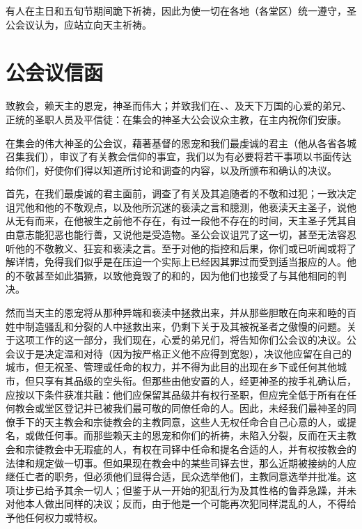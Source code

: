 有人在主日和五旬节期间跪下祈祷，因此为使一切在各地（各堂区）统一遵守，圣公会议认为，应站立向天主祈祷。\par


\section{公会议信函}

致教会，赖天主的恩宠，神圣而伟大；并致我们在、、及天下万国的心爱的弟兄、正统的圣职人员及平信徒：在集会的神圣大公会议众主教，在主内祝你们安康。\par

在集会的伟大神圣的公会议，藉著基督的恩宠和我们最虔诚的君主（他从各省各城召集我们），审议了有关教会信仰的事宜，我们以为有必要将若干事项以书面传达给你们，好使你们得以知道所讨论和调查的内容，以及所颁布和确认的决议。\par

首先，在我们最虔诚的君主面前，调查了有关及其追随者的不敬和过犯；一致决定诅咒他和他的不敬观点，以及他所沉迷的亵渎之言和臆测，他亵渎天主圣子，说他从无有而来，在他被生之前他不存在，有过一段他不存在的时间，天主圣子凭其自由意志能犯恶也能行善，又说他是受造物。圣公会议诅咒了这一切，甚至无法容忍听他的不敬教义、狂妄和亵渎之言。至于对他的指控和后果，你们或已听闻或将了解详情，免得我们似乎是在压迫一个实际上已经因其罪过而受到适当报应的人。他的不敬甚至如此猖獗，以致他竟毁了的和的，因为他们也接受了与其他相同的判决。\par

然而当天主的恩宠将从那种异端和亵渎中拯救出来，并从那些胆敢在向来和睦的百姓中制造骚乱和分裂的人中拯救出来，仍剩下关于及其被祝圣者之傲慢的问题。关于这项工作的这一部分，我们现在，心爱的弟兄们，将告知你们公会议的决议。公会议于是决定温和对待（因为按严格正义他不应得到宽恕），决议他应留在自己的城市，但无祝圣、管理或任命的权力，并不得为此目的出现在乡下或任何其他城市，但只享有其品级的空头衔。但那些由他安置的人，经更神圣的按手礼确认后，应按以下条件获准共融：他们应保留其品级并有权行圣职，但应完全低于所有在任何教会或堂区登记并已被我们最可敬的同僚任命的人。因此，未经我们最神圣的同僚手下的天主教会和宗徒教会的主教同意，这些人无权任命合自己心意的人，或提名，或做任何事。而那些赖天主的恩宠和你们的祈祷，未陷入分裂，反而在天主教会和宗徒教会中无瑕疵的人，有权在司铎中任命和提名合适的人，并有权按教会的法律和规定做一切事。但如果现在教会中的某些司铎去世，那么近期被接纳的人应继任亡者的职务，但必须他们显得合适，民众选举他们，主教同意选举并批准。这项让步已给予其余一切人；但鉴于从一开始的犯乱行为及其性格的鲁莽急躁，并未对他本人做出同样的决议；反而，由于他是一个可能再次犯同样混乱的人，不得给予他任何权力或特权。\par

